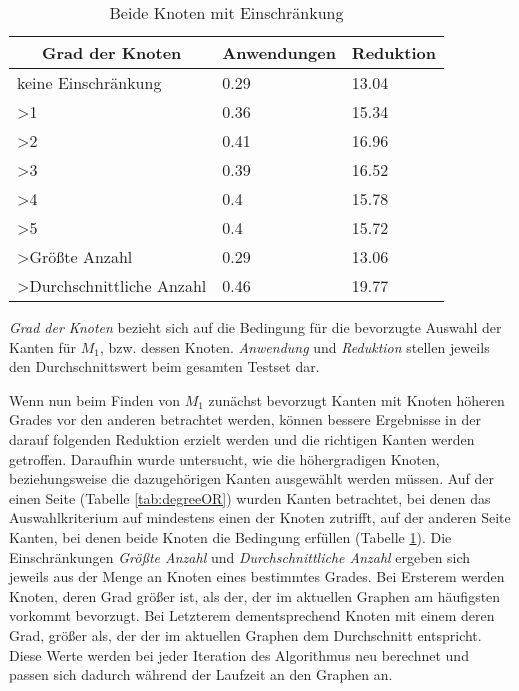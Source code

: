 \begin{table}[htb]
\caption{Beide Knoten mit Einschränkung\label{tab:degreeAND}}
\vspace*{1em}
\centering

\bgroup
\def\arraystretch{1.3}%

\begin{threeparttable}

\begin{tabular}[c]{lll}
	\hline
	\multicolumn{1}{c}{\textbf{Grad der Knoten}} & 
	\multicolumn{1}{c}{\textbf{Anwendungen}} & 
	\multicolumn{1}{c}{\textbf{Reduktion}} \\ 
	
	\hline

	keine Einschränkung&0.29&13.04\\
	>1&0.36 &15.34 \\
	>2&0.41 &16.96 \\
	>3& 0.39& 16.52 \\
	>4& 0.4 &15.78 \\
	>5& 0.4 & 15.72\\
	>Größte Anzahl& 0.29 &13.06 \\
	>Durchschnittliche Anzahl& 0.46&19.77 \\
	\hline
\end{tabular}
\begin{tablenotes}\footnotesize
\item \emph{Grad der Knoten} bezieht sich auf die Bedingung für die bevorzugte Auswahl der Kanten für $M_{1}$, bzw. dessen Knoten. \emph{Anwendung} und \emph{Reduktion} stellen jeweils den Durchschnittswert beim gesamten Testset dar.
\end{tablenotes}

\end{threeparttable}

\egroup

\end{table}
Wenn nun beim Finden von $M_{1}$ zunächst bevorzugt Kanten mit Knoten höheren Grades vor den anderen betrachtet werden, können bessere Ergebnisse in der darauf folgenden Reduktion erzielt werden und die richtigen Kanten werden getroffen. Daraufhin wurde untersucht, wie die höhergradigen Knoten, beziehungsweise die dazugehörigen Kanten ausgewählt werden müssen. Auf der einen Seite (Tabelle \ref{tab:degreeOR}) wurden Kanten betrachtet, bei denen das Auswahlkriterium auf mindestens einen der Knoten zutrifft, auf der anderen Seite Kanten, bei denen beide Knoten die Bedingung erfüllen (Tabelle \ref{tab:degreeAND}). Die Einschränkungen \emph{Größte Anzahl} und \emph{Durchschnittliche Anzahl} ergeben sich jeweils aus der Menge an Knoten eines bestimmtes Grades. Bei Ersterem werden Knoten, deren Grad größer ist, als der, der im aktuellen Graphen am häufigsten vorkommt bevorzugt. Bei Letzterem dementsprechend Knoten mit einem deren Grad, größer als, der der im aktuellen Graphen dem Durchschnitt entspricht. Diese Werte werden bei jeder Iteration des Algorithmus neu berechnet und passen sich dadurch während der Laufzeit an den Graphen an.\\ 
